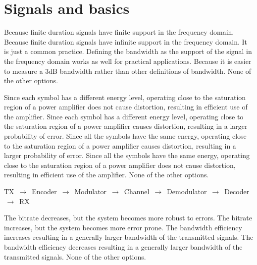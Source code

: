 \section{Signals and basics}


\begin{checkboxes}
    \choice Because finite duration signals have finite support in the frequency domain.
    \CorrectChoice Because finite duration signals have infinite support in the frequency domain.
    \choice It is just a common practice. Defining the bandwidth as the support of the signal in the frequency domain works as well for practical applications.
    \choice Because it is easier to measure a 3dB bandwidth rather than other definitions of bandwidth.
    \choice None of the other options.
\end{checkboxes}

\begin{checkboxes}
    \choice Since each symbol has a different energy level, operating close to the saturation region of a power amplifier does not cause distortion, resulting in efficient use of the amplifier.
    \choice Since each symbol has a different energy level, operating close to the saturation region of a power amplifier causes distortion, resulting in a larger probability of error.
    \choice Since all the symbols have the same energy, operating close to the saturation region of a power amplifier causes distortion, resulting in a larger probability of error.
    \CorrectChoice Since all the symbols have the same energy, operating close to the saturation region of a power amplifier does not cause distortion, resulting in efficient use of the amplifier.
    \choice None of the other options.
\end{checkboxes}

\begin{solution}
    TX $\,\to\,$ Encoder $\,\to\,$ Modulator  $\,\to\,$ Channel  $\,\to\,$ Demodulator  $\,\to\,$ Decoder  $\,\to\,$ RX
\end{solution}

\begin{checkboxes}
    \choice The bitrate decreases, but the system becomes more robust to errors.
    \CorrectChoice The bitrate increases, but the system becomes more error prone.
    \choice The bandwidth efficiency increases resulting in a generally larger bandwidth of the transmitted signals.
    \choice The bandwidth efficiency decreases resulting in a generally larger bandwidth of the transmitted signals.
    \choice None of the other options.
\end{checkboxes}


